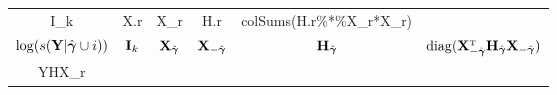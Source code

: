 \documentclass[
]{book}
\begin{document}
\begin{longtable}[]{@{}cccccc@{}}
\begin{minipage}[t]{0.14\columnwidth}
I\_k\strut
\end{minipage} & \begin{minipage}[t]{0.14\columnwidth}\centering
X.r\strut
\end{minipage} & \begin{minipage}[t]{0.14\columnwidth}\centering
X\_r\strut
\end{minipage} & \begin{minipage}[t]{0.14\columnwidth}\centering
H.r\strut
\end{minipage} & \begin{minipage}[t]{0.14\columnwidth}\centering
colSums(H.r\%*\%X\_r*X\_r)\strut
\end{minipage}\tabularnewline
\begin{minipage}[t]{0.14\columnwidth}\centering
\(\log(s({\bf Y}|\hat{\boldsymbol \gamma}\cup i))\)\strut
\end{minipage} & \begin{minipage}[t]{0.14\columnwidth}\centering
\({\bf I}_k\)\strut
\end{minipage} & \begin{minipage}[t]{0.14\columnwidth}\centering
\({\bf X}_{\hat{\boldsymbol \gamma}}\)\strut
\end{minipage} & \begin{minipage}[t]{0.14\columnwidth}\centering
\({\bf X}_{-\hat{\boldsymbol \gamma}}\)\strut
\end{minipage} & \begin{minipage}[t]{0.14\columnwidth}\centering
\({\bf H}_{\hat{\boldsymbol \gamma}}\)\strut
\end{minipage} & \begin{minipage}[t]{0.14\columnwidth}\centering
\({\rm diag}({\bf X}_{-\hat{\boldsymbol \gamma}}^{{ \mathrm{\scriptscriptstyle T} }}{\bf H}_{\hat{{\boldsymbol \gamma}}}{\bf X}_{-\hat{\boldsymbol \gamma}})\)\strut
\end{minipage}\tabularnewline
\begin{minipage}[t]{0.14\columnwidth}\centering
YHX\_r\strut
\end{minipage} & \begin{minipage}[t]{0.14\columnwidth}\centering
\strut
\end{minipage} & \begin{minipage}[t]{0.14\columnwidth}\centering
\strut
\end{minipage} & \begin{minipage}[t]{0.14\columnwidth}\centering
\strut
\end{minipage} & \begin{minipage}[t]{0.14\columnwidth}\centering

\end{minipage}
\end{longtable}
\end{document}
